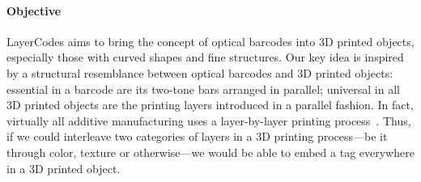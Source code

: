 \documentclass[12pt]{report}
\newcommand{\ft}{4,835 }
\begin{document}




\paragraph{Objective}
LayerCodes aims to bring the concept of optical barcodes into 3D printed objects, 
especially those with curved shapes and fine structures.
Our key idea is inspired by a structural resemblance between optical barcodes
and 3D printed objects: essential in a barcode are its two-tone bars
arranged in parallel; universal in all 3D printed objects are the printing
layers introduced in a parallel fashion. 
In fact, virtually all additive manufacturing uses a 
layer-by-layer printing process~\cite{LivesuEMLA17,redwood20173d}.
Thus, if we could interleave two categories of layers in a 3D printing process---be 
it through color, texture or otherwise---we 
would be able to embed a tag everywhere in a 3D printed object. 
\end{document}
